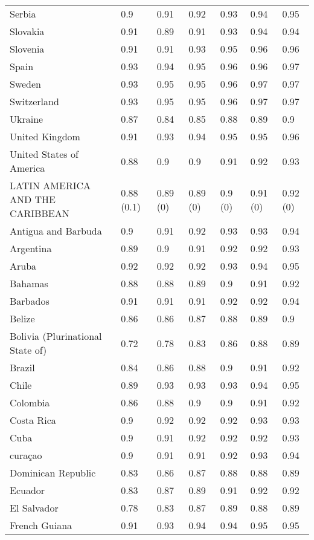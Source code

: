 \begin{longtable}[t]{lllllll}
Serbia & 0.9 & 0.91 & 0.92 & 0.93 & 0.94 & 0.95\\
Slovakia & 0.91 & 0.89 & 0.91 & 0.93 & 0.94 & 0.94\\
Slovenia & 0.91 & 0.91 & 0.93 & 0.95 & 0.96 & 0.96\\
Spain & 0.93 & 0.94 & 0.95 & 0.96 & 0.96 & 0.97\\
Sweden & 0.93 & 0.95 & 0.95 & 0.96 & 0.97 & 0.97\\
Switzerland & 0.93 & 0.95 & 0.95 & 0.96 & 0.97 & 0.97\\
Ukraine & 0.87 & 0.84 & 0.85 & 0.88 & 0.89 & 0.9\\
United Kingdom & 0.91 & 0.93 & 0.94 & 0.95 & 0.95 & 0.96\\
United States of America & 0.88 & 0.9 & 0.9 & 0.91 & 0.92 & 0.93\\
LATIN AMERICA AND THE CARIBBEAN & 0.88 (0.1) & 0.89 (0) & 0.89 (0) & 0.9 (0) & 0.91 (0) & 0.92 (0)\\
Antigua and Barbuda & 0.9 & 0.91 & 0.92 & 0.93 & 0.93 & 0.94\\
Argentina & 0.89 & 0.9 & 0.91 & 0.92 & 0.92 & 0.93\\
Aruba & 0.92 & 0.92 & 0.92 & 0.93 & 0.94 & 0.95\\
Bahamas & 0.88 & 0.88 & 0.89 & 0.9 & 0.91 & 0.92\\
Barbados & 0.91 & 0.91 & 0.91 & 0.92 & 0.92 & 0.94\\
Belize & 0.86 & 0.86 & 0.87 & 0.88 & 0.89 & 0.9\\
Bolivia (Plurinational State of) & 0.72 & 0.78 & 0.83 & 0.86 & 0.88 & 0.89\\
Brazil & 0.84 & 0.86 & 0.88 & 0.9 & 0.91 & 0.92\\
Chile & 0.89 & 0.93 & 0.93 & 0.93 & 0.94 & 0.95\\
Colombia & 0.86 & 0.88 & 0.9 & 0.9 & 0.91 & 0.92\\
Costa Rica & 0.9 & 0.92 & 0.92 & 0.92 & 0.93 & 0.93\\
Cuba & 0.9 & 0.91 & 0.92 & 0.92 & 0.92 & 0.93\\
curaçao & 0.9 & 0.91 & 0.91 & 0.92 & 0.93 & 0.94\\
Dominican Republic & 0.83 & 0.86 & 0.87 & 0.88 & 0.88 & 0.89\\
Ecuador & 0.83 & 0.87 & 0.89 & 0.91 & 0.92 & 0.92\\
El Salvador & 0.78 & 0.83 & 0.87 & 0.89 & 0.88 & 0.89\\
French Guiana & 0.91 & 0.93 & 0.94 & 0.94 & 0.95 & 0.95\\

\end{longtable}
